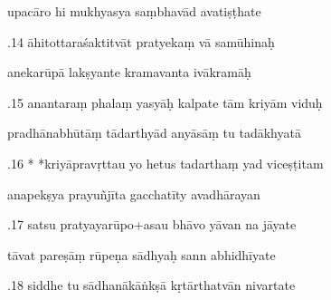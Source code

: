 \documentclass[article,12pt,a4paper]{memoir}%
\newcounter{parCount}
\begin{document}
	  
	  \pstart \leavevmode%
	upacāro hi mukhyasya saṃbhavād avatiṣṭhate 
	{}
	\pend%
      

	  
	  \pstart {}.14 āhitottaraśaktitvāt pratyekaṃ vā samūhinaḥ 
	{}
	\pend%
      

	  
	  \pstart \leavevmode%
	anekarūpā lakṣyante kramavanta ivākramāḥ 
	{}
	\pend%
      

	  
	  \pstart {}.15 anantaraṃ phalaṃ yasyāḥ kalpate tām kriyām viduḥ 
	{}
	\pend%
      

	  
	  \pstart \leavevmode%
	pradhānabhūtāṃ tādarthyād anyāsāṃ tu tadākhyatā 
	{}
	\pend%
      

	  
	  \pstart {}.16 * *kriyāpravṛttau yo hetus tadarthaṃ yad viceṣṭitam 
	{}
	\pend%
      

	  
	  \pstart \leavevmode%
	anapekṣya prayuñjīta gacchatīty avadhārayan 
	{}
	\pend%
      

	  
	  \pstart {}.17 satsu pratyayarūpo+asau bhāvo yāvan na jāyate 
	{}
	\pend%
      

	  
	  \pstart \leavevmode%
	tāvat pareṣāṃ rūpeṇa sādhyaḥ sann abhidhīyate 
	{}
	\pend%
      

	  
	  \pstart {}.18 siddhe tu sādhanākāṅkṣā kṛtārthatvān nivartate 
	{}
	\pend%
      
\end{document}
